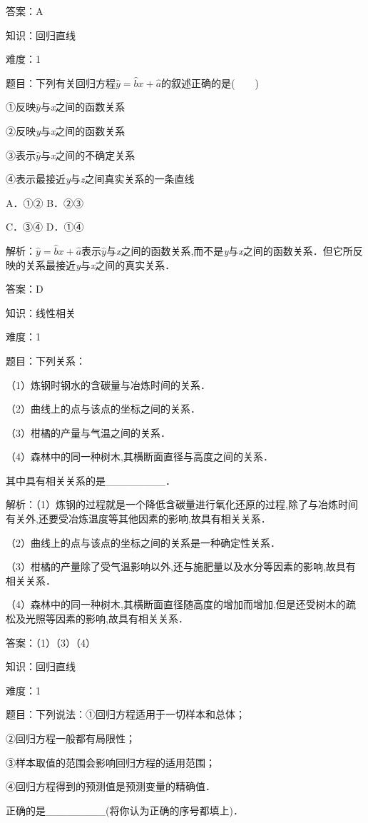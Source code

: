 \documentclass{article} %
\begin{document}
答案：A

知识：回归直线

难度：1

题目：下列有关回归方程$\hat{y}=\hat{b}x+\hat{a}$的叙述正确的是(　　)

①反映$\hat{y}$与\textit{x}之间的函数关系

②反映\textit{y}与\textit{x}之间的函数关系

③表示$\hat{y}$与\textit{x}之间的不确定关系

④表示最接近\textit{y}与\textit{z}之间真实关系的一条直线

A．①② B．②③

C．③④  D．①④

解析：$\hat{y}=\hat{b}x+\hat{a}$表示$\hat{y}$与\textit{x}之间的函数关系,而不是\textit{y}与\textit{x}之间的函数关系．但它所反映的关系最接近\textit{y}与\textit{x}之间的真实关系．

答案：D

知识：线性相关

难度：1

题目：下列关系：

（1）炼钢时钢水的含碳量与冶炼时间的关系．

（2）曲线上的点与该点的坐标之间的关系．

（3）柑橘的产量与气温之间的关系．

（4）森林中的同一种树木,其横断面直径与高度之间的关系．

其中具有相关关系的是\_\_\_\_\_\_\_\_．

解析：（1）炼钢的过程就是一个降低含碳量进行氧化还原的过程,除了与冶炼时间有关外,还要受冶炼温度等其他因素的影响,故具有相关关系．

（2）曲线上的点与该点的坐标之间的关系是一种确定性关系．

（3）柑橘的产量除了受气温影响以外,还与施肥量以及水分等因素的影响,故具有相关关系．

（4）森林中的同一种树木,其横断面直径随高度的增加而增加,但是还受树木的疏松及光照等因素的影响,故具有相关关系．

答案：（1）（3）（4）

知识：回归直线

难度：1

题目：下列说法：①回归方程适用于一切样本和总体；

②回归方程一般都有局限性；

③样本取值的范围会影响回归方程的适用范围；

④回归方程得到的预测值是预测变量的精确值．

正确的是\_\_\_\_\_\_\_\_(将你认为正确的序号都填上)．
\end{document}
